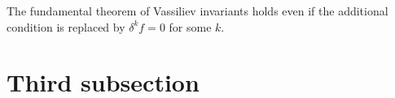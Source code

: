 \begin{corollary}
	The fundamental theorem of Vassiliev invariants holds even if the additional condition is replaced by \(\delta^{k} f = 0\) for some \(k\).
\end{corollary}




\section{Third subsection}

